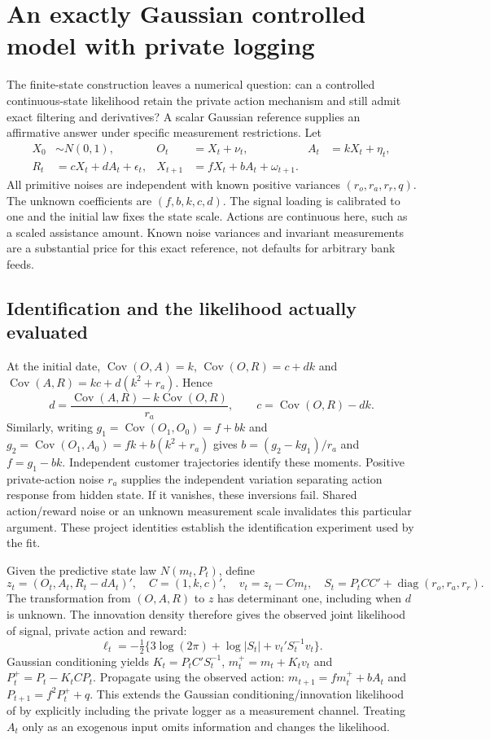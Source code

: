 \section{An exactly Gaussian controlled model with private logging}
\label{s5:continuous-controlled}
The finite-state construction leaves a numerical question: can a controlled
continuous-state likelihood retain the private action mechanism and still
admit exact filtering and derivatives? A scalar Gaussian reference supplies
an affirmative answer under specific measurement restrictions. Let
\begin{align}
 X_0&\sim N(0,1), & O_t&=X_t+\nu_t, & A_t&=kX_t+\eta_t,\\
 R_t&=cX_t+dA_t+\epsilon_t, &
 X_{t+1}&=fX_t+bA_t+\omega_{t+1}.
 \label{s5:gaussian-private-law}
\end{align}
All primitive noises are independent with known positive variances
$(r_o,r_a,r_r,q)$. The unknown coefficients are $(f,b,k,c,d)$.
The signal loading is calibrated to one and the initial law fixes the state
scale. Actions are continuous here, such as a scaled assistance amount.
Known noise variances and invariant measurements are a substantial price for
this exact reference, not defaults for arbitrary bank feeds.

\subsection{Identification and the likelihood actually evaluated}
At the initial date, $\operatorname{Cov}(O,A)=k$,
$\operatorname{Cov}(O,R)=c+dk$ and
$\operatorname{Cov}(A,R)=kc+d(k^2+r_a)$. Hence
\[
 d=\frac{\operatorname{Cov}(A,R)-k\operatorname{Cov}(O,R)}{r_a},
 \qquad c=\operatorname{Cov}(O,R)-dk.
\]
Similarly, writing $g_1=\operatorname{Cov}(O_1,O_0)=f+bk$ and
$g_2=\operatorname{Cov}(O_1,A_0)=fk+b(k^2+r_a)$ gives
$b=(g_2-kg_1)/r_a$ and $f=g_1-bk$. Independent customer trajectories
identify these moments. Positive private-action noise $r_a$ supplies the
independent variation separating action response from hidden state. If it
vanishes, these inversions fail. Shared action/reward noise or an unknown
measurement scale invalidates this particular argument. These project
identities establish the identification experiment used by the fit.

Given the predictive state law $N(m_t,P_t)$, define
\[
 z_t=(O_t,A_t,R_t-dA_t)',\quad C=(1,k,c)',\quad
 v_t=z_t-Cm_t,\quad S_t=P_tCC'+\operatorname{diag}(r_o,r_a,r_r).
\]
The transformation from $(O,A,R)$ to $z$ has determinant one, including
when $d$ is unknown. The innovation density therefore gives the observed
joint likelihood of signal, private action and reward:
\[
 \ell_t=-\tfrac12\{3\log(2\pi)+\log|S_t|+v_t'S_t^{-1}v_t\}.
\]
Gaussian conditioning yields $K_t=P_tC'S_t^{-1}$,
$m_t^+=m_t+K_tv_t$ and $P_t^+=P_t-K_tCP_t$. Propagate using the observed
action: $m_{t+1}=fm_t^++bA_t$ and $P_{t+1}=f^2P_t^++q$.
This extends the Gaussian conditioning/innovation likelihood of
\citet[Theorems 4.2 and 12.1]{sarkka2013} by explicitly including the
private logger as a measurement channel. Treating $A_t$ only as an exogenous
input omits information and changes the likelihood.

